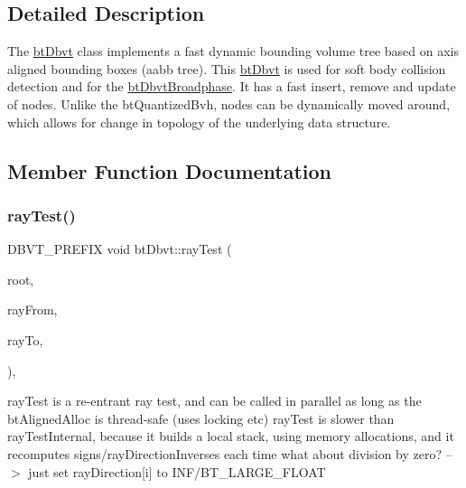 \subsection{Detailed Description}
The \hyperlink{structbtDbvt}{bt\+Dbvt} class implements a fast dynamic bounding volume tree based on axis aligned bounding boxes (aabb tree). This \hyperlink{structbtDbvt}{bt\+Dbvt} is used for soft body collision detection and for the \hyperlink{structbtDbvtBroadphase}{bt\+Dbvt\+Broadphase}. It has a fast insert, remove and update of nodes. Unlike the bt\+Quantized\+Bvh, nodes can be dynamically moved around, which allows for change in topology of the underlying data structure. 

\subsection{Member Function Documentation}
\mbox{\label{structbtDbvt_a8e316ee3bc9bd7b7354086c0c558cfb5}} 
\subsubsection{\texorpdfstring{ray\+Test()}{rayTest()}\hspace{0.1cm}{\footnotesize\ttfamily [1/2]}}
{\footnotesize\ttfamily D\+B\+V\+T\+\_\+\+P\+R\+E\+F\+IX void bt\+Dbvt\+::ray\+Test (\begin{DoxyParamCaption}\item[{const \hyperlink{structbtDbvtNode}{bt\+Dbvt\+Node} $\ast$}]{root,  }\item[{const bt\+Vector3 \&}]{ray\+From,  }\item[{const bt\+Vector3 \&}]{ray\+To,  }\item[{D\+B\+V\+T\+\_\+\+I\+P\+O\+L\+I\+CY}]{ }\end{DoxyParamCaption})\hspace{0.3cm}{\ttfamily [inline]}, {\ttfamily [static]}}

ray\+Test is a re-\/entrant ray test, and can be called in parallel as long as the bt\+Aligned\+Alloc is thread-\/safe (uses locking etc) ray\+Test is slower than ray\+Test\+Internal, because it builds a local stack, using memory allocations, and it recomputes signs/ray\+Direction\+Inverses each time what about division by zero? --$>$ just set ray\+Direction\mbox{[}i\mbox{]} to I\+N\+F/\+B\+T\+\_\+\+L\+A\+R\+G\+E\+\_\+\+F\+L\+O\+AT \mbox{\label{structbtDbvt_a7c46f4b9f5ee3df6970f94f2b0315859}} 
